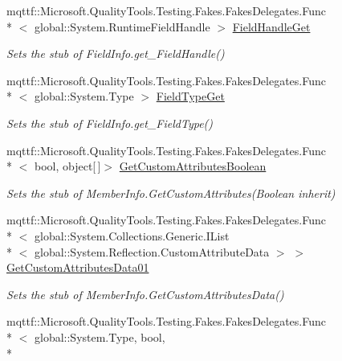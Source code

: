 \begin{DoxyCompactItemize}
mqttf\-::\-Microsoft.\-Quality\-Tools.\-Testing.\-Fakes.\-Fakes\-Delegates.\-Func\\*
$<$ global\-::\-System.\-Runtime\-Field\-Handle $>$ \hyperlink{class_system_1_1_reflection_1_1_fakes_1_1_stub_field_info_adb9d8a5db423458e8dcdf55419c2a365}{Field\-Handle\-Get}
\begin{DoxyCompactList}\small\item\em Sets the stub of Field\-Info.\-get\-\_\-\-Field\-Handle()\end{DoxyCompactList}\item 
mqttf\-::\-Microsoft.\-Quality\-Tools.\-Testing.\-Fakes.\-Fakes\-Delegates.\-Func\\*
$<$ global\-::\-System.\-Type $>$ \hyperlink{class_system_1_1_reflection_1_1_fakes_1_1_stub_field_info_a7ed870f09a9e961b61001c6d1293462d}{Field\-Type\-Get}
\begin{DoxyCompactList}\small\item\em Sets the stub of Field\-Info.\-get\-\_\-\-Field\-Type()\end{DoxyCompactList}\item 
mqttf\-::\-Microsoft.\-Quality\-Tools.\-Testing.\-Fakes.\-Fakes\-Delegates.\-Func\\*
$<$ bool, object\mbox{[}$\,$\mbox{]}$>$ \hyperlink{class_system_1_1_reflection_1_1_fakes_1_1_stub_field_info_ad9f577a61d074a15b0d6b1174bbc6a04}{Get\-Custom\-Attributes\-Boolean}
\begin{DoxyCompactList}\small\item\em Sets the stub of Member\-Info.\-Get\-Custom\-Attributes(\-Boolean inherit)\end{DoxyCompactList}\item 
mqttf\-::\-Microsoft.\-Quality\-Tools.\-Testing.\-Fakes.\-Fakes\-Delegates.\-Func\\*
$<$ global\-::\-System.\-Collections.\-Generic.\-I\-List\\*
$<$ global\-::\-System.\-Reflection.\-Custom\-Attribute\-Data $>$ $>$ \hyperlink{class_system_1_1_reflection_1_1_fakes_1_1_stub_field_info_a2552105ca2991820842736b3a012b38f}{Get\-Custom\-Attributes\-Data01}
\begin{DoxyCompactList}\small\item\em Sets the stub of Member\-Info.\-Get\-Custom\-Attributes\-Data()\end{DoxyCompactList}\item 
mqttf\-::\-Microsoft.\-Quality\-Tools.\-Testing.\-Fakes.\-Fakes\-Delegates.\-Func\\*
$<$ global\-::\-System.\-Type, bool, \\*

\end{DoxyCompactItemize}
